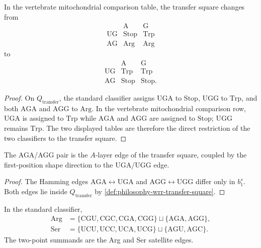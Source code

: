 \begin{theorem}
\label{thm:philosophy-vertebrate-mitochondrial-transfer-square}
In the vertebrate mitochondrial comparison table, the transfer square
changes from
$$
\begin{array}{c|cc}
  & \mathrm{A} & \mathrm{G}\\
\hline
  \mathrm{U}\mathrm{G} & \mathrm{Stop} & \mathrm{Trp}\\
  \mathrm{A}\mathrm{G} & \mathrm{Arg} & \mathrm{Arg}
\end{array}
$$
to
$$
\begin{array}{c|cc}
  & \mathrm{A} & \mathrm{G}\\
\hline
  \mathrm{U}\mathrm{G} & \mathrm{Trp} & \mathrm{Trp}\\
  \mathrm{A}\mathrm{G} & \mathrm{Stop} & \mathrm{Stop}.
\end{array}
$$
\end{theorem}
\begin{proof}
On $Q_{\mathrm{transfer}}$, the standard classifier assigns
$\mathrm{UGA}$ to $\mathrm{Stop}$, $\mathrm{UGG}$ to $\mathrm{Trp}$,
and both $\mathrm{AGA}$ and $\mathrm{AGG}$ to $\mathrm{Arg}$. In the
vertebrate mitochondrial comparison row, $\mathrm{UGA}$ is assigned to
$\mathrm{Trp}$ while $\mathrm{AGA}$ and $\mathrm{AGG}$ are assigned to
$\mathrm{Stop}$; $\mathrm{UGG}$ remains $\mathrm{Trp}$. The two displayed
tables are therefore the direct restriction of the two classifiers to
the transfer square.
\end{proof}

\begin{corollary}
\label{cor:philosophy-aga-agg-transfer-geometry}
The AGA/AGG pair is the $A$-layer edge of the transfer square, coupled
by the first-position shape direction to the UGA/UGG edge.
\end{corollary}
\begin{proof}
The Hamming edges $\mathrm{AGA}\leftrightarrow\mathrm{UGA}$ and
$\mathrm{AGG}\leftrightarrow\mathrm{UGG}$ differ only in $b_{1}^{s}$.
Both edges lie inside $Q_{\mathrm{transfer}}$ by
\autoref{def:philosophy-wrr-transfer-square}.
\end{proof}

\begin{definition}
\label{def:philosophy-arg-ser-satellite-edges}
In the standard classifier,
$$
\begin{aligned}
  \mathrm{Arg}
    &=
      \{\mathrm{CGU},\mathrm{CGC},\mathrm{CGA},\mathrm{CGG}\}
      \sqcup
      \{\mathrm{AGA},\mathrm{AGG}\},\\
  \mathrm{Ser}
    &=
      \{\mathrm{UCU},\mathrm{UCC},\mathrm{UCA},\mathrm{UCG}\}
      \sqcup
      \{\mathrm{AGU},\mathrm{AGC}\}.
\end{aligned}
$$
The two-point summands are the Arg and Ser satellite edges.
\end{definition}

